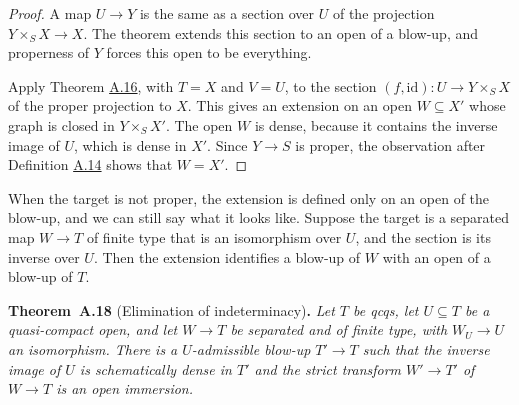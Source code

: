 \documentclass[11pt]{article}
\newenvironment{bpstatement}[2]{\par\addvspace{0.6\baselineskip}\noindent\textbf{#1}#2\textbf{.}\enspace\ignorespaces}
  {\par\addvspace{0.4\baselineskip}}
\newenvironment{bpstatementit}[2]{\begin{bpstatement}{#1}{#2}\itshape\ignorespaces}{\end{bpstatement}}
\begin{document}
\begin{proof}[{Proof}]\label{bp46}%
A map \(U\to Y\) is the same as a section over \(U\) of the projection \(Y\times_SX\to X\). The theorem extends this section to an open of a blow-up, and properness of \(Y\) forces this open to be everything.

Apply Theorem \hyperref[bp43]{A.16}, with \(T=X\) and \(V=U\), to the section \((f,\mathrm{id}):U\to Y\times_SX\) of the proper projection to \(X\). This gives an extension on an open \(W\subseteq X'\) whose graph is closed in \(Y\times_SX'\). The open \(W\) is dense, because it contains the inverse image of \(U\), which is dense in \(X'\). Since \(Y\to S\) is proper, the observation after Definition \hyperref[bp38]{A.14} shows that \(W=X'\).
\end{proof}

\label{bp47}%
When the target is not proper, the extension is defined only on an open of the blow-up, and we can still say what it looks like. Suppose the target is a separated map \(W\to T\) of finite type that is an isomorphism over \(U\), and the section is its inverse over \(U\). Then the extension identifies a blow-up of \(W\) with an open of a blow-up of \(T\).

\label{bp48}%
\begin{bpstatementit}{Theorem~A.18}{ (Elimination of indeterminacy)}
Let \(T\) be qcqs, let \(U\subseteq T\) be a quasi-compact open, and let \(W\to T\) be separated and of finite type, with \(W_U\to U\) an isomorphism. There is a \(U\)-admissible blow-up \(T'\to T\) such that the inverse image of \(U\) is schematically dense in \(T'\) and the strict transform \(W'\to T'\) of \(W\to T\) is an open immersion.
\end{bpstatementit}
\end{document}
